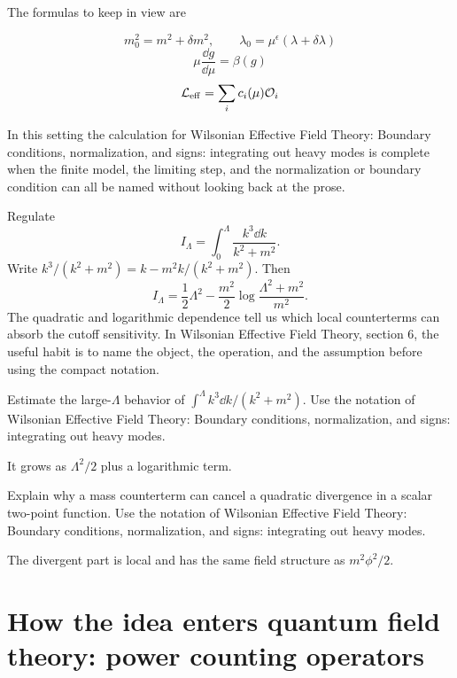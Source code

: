 The formulas to keep in view are

\[
  m_0^2=m^2+\delta m^2,\qquad \lambda_0=\mu^\epsilon(\lambda+\delta\lambda)
\]
\[
  \mu\frac{\dd g}{\dd\mu}=\beta(g)
\]
\[
  \mathcal L_{\mathrm{eff}}=\sum_i c_i(\mu)\mathcal O_i
\]

In this setting the calculation for Wilsonian Effective Field Theory: Boundary conditions, normalization, and signs: integrating out heavy modes is complete when the finite model, the limiting step, and the normalization or boundary condition can all be named without looking back at the prose.




\begin{example}
Regulate
\[
  I_\Lambda=\int_0^\Lambda\frac{k^3\dd k}{k^2+m^2}.
\]
Write \(k^3/(k^2+m^2)=k-m^2k/(k^2+m^2)\).  Then
\[
  I_\Lambda=\frac12\Lambda^2-\frac{m^2}{2}\log\frac{\Lambda^2+m^2}{m^2}.
\]
The quadratic and logarithmic dependence tell us which local counterterms can absorb the cutoff sensitivity.  In Wilsonian Effective Field Theory, section 6, the useful habit is to name the object, the operation, and the assumption before using the compact notation.
\end{example}



\begin{exercise}
Estimate the large-\(\Lambda\) behavior of \(\int^\Lambda k^3\dd k/(k^2+m^2)\).  Use the notation of Wilsonian Effective Field Theory: Boundary conditions, normalization, and signs: integrating out heavy modes.
\begin{answer}
It grows as \(\Lambda^2/2\) plus a logarithmic term.
\end{answer}
\end{exercise}

\begin{exercise}
Explain why a mass counterterm can cancel a quadratic divergence in a scalar two-point function.  Use the notation of Wilsonian Effective Field Theory: Boundary conditions, normalization, and signs: integrating out heavy modes.
\begin{answer}
The divergent part is local and has the same field structure as \(m^2\phi^2/2\).
\end{answer}
\end{exercise}



\section{How the idea enters quantum field theory: power counting operators}

